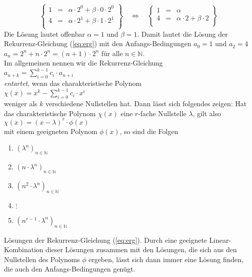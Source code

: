 \[
\left\{
\begin{array}{lcl}
  1 & = & \alpha \cdot 2^0 + \beta \cdot 0 \cdot 2^0 \\
  4 & = & \alpha \cdot 2^1 + \beta \cdot 1 \cdot 2^1 \\
\end{array}
\right\} \quad\Leftrightarrow\quad \left\{
\begin{array}{lcl}
  1 & = & \alpha \\
  4 & = & \alpha \cdot 2 + \beta \cdot 2 \\
\end{array}
\right\}\]
Die L\"osung lautet offenbar $\alpha = 1$ und $\beta = 1$.  Damit lautet die L\"osung der
Rekurrenz-Gleichung (\ref{eq:erg}) mit den Anfangs-Bedingungen $a_0 = 1$ und $a_2 = 4$ \\[0.1cm]
\hspace*{1.3cm} $a_n = 2^n + n \cdot 2^n = (n+1) \cdot 2^n$ \quad f\"ur alle $n \in \mathbb{N}$.  \\[0.1cm]
Im allgemeinen nennen wir die Rekurrenz-Gleichung \\[0.1cm]
\hspace*{1.3cm} $a_{n+k} = \sum\limits_{i=0}^{k-1} c_{i} \cdot a_{n+i}$ \\[0.1cm]
\emph{entartet}, wenn das charakteristische Polynom \\[0.1cm]
\hspace*{1.3cm} $\chi(x) = x^k - \sum\limits_{i=0}^{k-1} c_{i} \cdot x^{i}$  \\[0.1cm]
weniger als $k$ verschiedene Nullstellen hat.  Dann l\"asst sich folgendes
zeigen:  Hat das charakteristische Polynom $\chi(x)$ eine $r$-fache Nullstelle
$\lambda$, gilt also \\[0.1cm]
\hspace*{1.3cm} $\chi(x) = (x - \lambda)^r \cdot \phi(x)$ \\[0.1cm]
mit einem geeigneten Polynom $\phi(x)$, so sind die Folgen
\begin{enumerate}
\item $(\lambda^n)_{n\in\mathbb{N}}$
\item $(n\cdot\lambda^n)_{n\in\mathbb{N}}$
\item $(n^2\cdot\lambda^n)_{n\in\mathbb{N}}$
\item $\vdots$
\item $(n^{r-1}\cdot\lambda^n)_{n\in\mathbb{N}}$
\end{enumerate}
L\"osungen der Rekurrenz-Gleichung (\ref{eq:erg}).  Durch eine geeignete Linear-Kombination dieser
L\"osungen zusammen mit den L\"osungen, die sich aus den Nullstellen des Polynoms $\phi$
ergeben, l\"asst sich dann immer eine L\"osung finden, die auch den Anfangs-Bedingungen gen\"ugt.
\vspace*{0.3cm}

